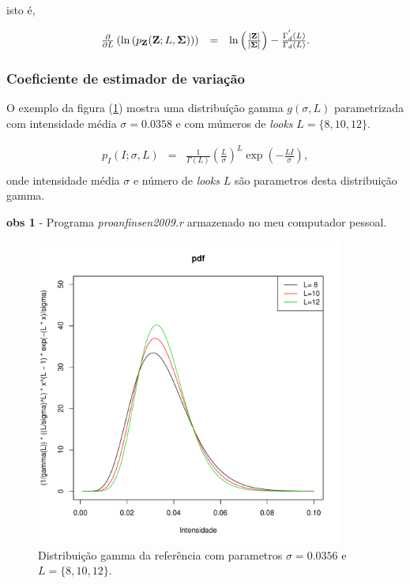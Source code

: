 \documentclass[10pt,a4paper]{article}
\begin{document}
isto é, 

\begin{equation}\label{sec41eqn8}
\begin{array}{ccc}
	\frac{\partial}{\partial L}\left(\ln{\left(p_{{\bf Z}}({\bf Z};L,{\bf \Sigma})\right)}\right)&=&\ln{\left(\frac{|{\bf Z}|}{|{\bf \Sigma}|}\right)} - \frac{\Gamma^{'}_d(L)}{\Gamma_d(L)}. \\
\end{array}
\end{equation}
\subsubsection{Coeficiente de estimador de variação}

 O exemplo da figura (\ref{sec41fig1}) mostra uma distribuíção gamma $g(\sigma, L)$ parametrizada com intensidade média $\sigma=0.0358$ e com múmeros de {\it looks} $L=\{8,10,12\}$.

\begin{equation}\label{sec41eqn6}
\begin{array}{ccc}
	p_{I}(I;\sigma,L)&=&\frac{1}{\Gamma(L)}\left(\frac{L}{\sigma}\right)^L \exp(-\frac{LI}{\sigma}), \\
\end{array}
\end{equation}
onde intensidade média $\sigma$ e número de {\it looks} $L$ são parametros desta distribuição gamma.

{\bf obs 1} - Programa {\it proanfinsen2009.r} armazenado no meu computador pessoal.

\begin{figure}[!h]
\centering
\includegraphics[width=4.0in]{fig_1_anfinsen_2009.pdf}
	\caption{Distribuição gamma da referência \cite{anfinsen2009} com parametros $\sigma=0.0356$ e $L=\{8,10,12\}$.}
\label{sec41fig1}
\end{figure}
\end{document}
